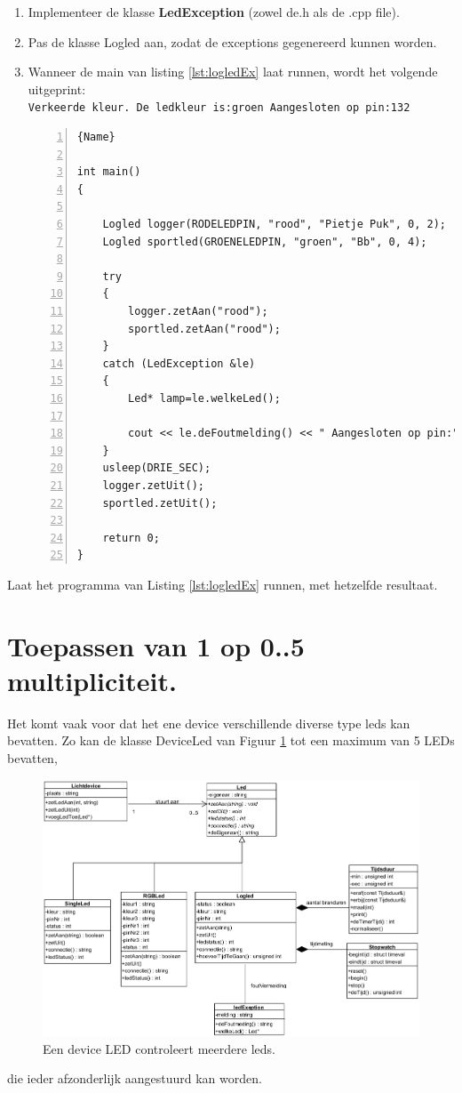 \begin{enumerate}
	\item Implementeer de klasse \textbf{LedException} (zowel de.h als de .cpp file).
	\item Pas de klasse Logled aan, zodat de exceptions gegenereerd kunnen worden.
	\item Wanneer de main van listing \ref{lst:logledEx} laat runnen,
wordt het volgende uitgeprint:\\
\texttt{Verkeerde kleur. De ledkleur is:groen Aangesloten op pin:132}
\begin{lstlisting}[caption=Twee objecten van de klasse \texttt{LogLed}. ,frame=trbl,firstnumber=1,numbers=left,label={lst:logledEx}]{Name}
	
int main()
{
	
	Logled logger(RODELEDPIN, "rood", "Pietje Puk", 0, 2);
	Logled sportled(GROENELEDPIN, "groen", "Bb", 0, 4);
	
	try
	{
		logger.zetAan("rood");
		sportled.zetAan("rood");
	}
	catch (LedException &le)
	{
		Led* lamp=le.welkeLed();
		
		cout << le.deFoutmelding() << " Aangesloten op pin:" << lamp->connectie() << endl;
	}
	usleep(DRIE_SEC);
	logger.zetUit();
	sportled.zetUit();
	
	return 0;
}
\end{lstlisting}		
\end{enumerate}
Laat het programma van Listing \ref{lst:logledEx} runnen, met hetzelfde resultaat.

\section{Toepassen van 1 op  0..5 multipliciteit.}
Het komt vaak voor dat het ene device verschillende diverse type leds kan bevatten. Zo kan de klasse DeviceLed van Figuur \ref{fig:devled} tot een maximum van 5 LEDs bevatten,   
\begin{figure}[h!]
	\captionsetup{justification=centering}
	\includegraphics[width=1 \linewidth]{figuren/deviceled}     
	\centering
	\caption{Een device LED controleert meerdere leds.}
	\label{fig:devled}
\end{figure} 
die ieder afzonderlijk aangestuurd kan worden. 

